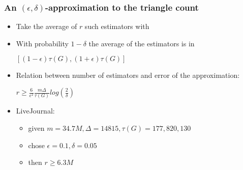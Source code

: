 \documentclass[11pt]{beamer}
\begin{document}
\begin{frame}
\frametitle{An $(\epsilon,\delta)$-approximation to the triangle count}
\begin{itemize}
\item Take the average of $r$ such estimators with
\item With probability $1-\delta$ the average of the estimators is in 
\begin{center}
$[(1-\epsilon)\tau(G),(1+\epsilon)\tau(G)]$
\end{center}
\pause
\item  Relation between number of estimators and error of the approximation:
\begin{center}
$r\geq\frac{6}{\epsilon^2}\frac{m\Delta}{\tau(G)}log(\frac{2}{\delta})$
\end{center}
\item LiveJournal:
\begin{itemize}
\item given \mbox{$m=34.7M, \Delta=14815, \tau(G)=177,820,130$}
\item chose $\epsilon=0.1, \delta=0.05$
\item then $r\geq6.3M$
\end{itemize}
\end{itemize}
\end{frame}
\end{document}
